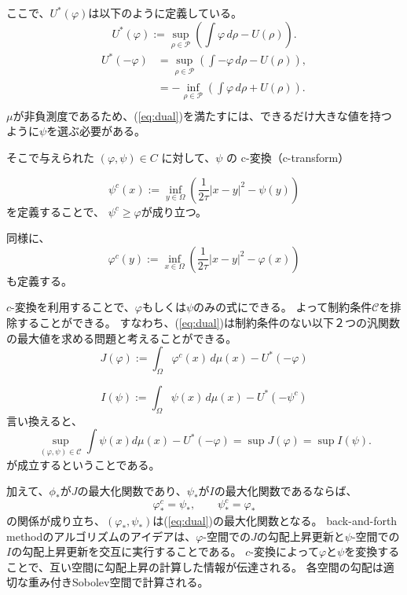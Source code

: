   ここで、$U^*(\varphi)$は以下のように定義している。 
  \[
    U^*(\varphi) := \sup_{\rho \in \mathcal{P}} \left(\int \varphi \, d\rho - U(\rho) \right).
  \]
  \begin{align*}
    U^*(- \varphi) &= \sup_{\rho \in \mathcal{P}} \left(\int - \varphi \, d\rho - U(\rho) \right),\\
                   &= - \inf_{\rho \in \mathcal{P}} \left(\int \varphi \, d\rho + U(\rho) \right) .\\
  \end{align*}
$\mu$が非負測度であるため、(\ref{eq:dual})を満たすには、できるだけ大きな値を持つように$\psi$を選ぶ必要がある。

そこで与えられた \((\varphi, \psi) \in C\) に対して、\(\psi\) の c-変換（c-transform）

\begin{equation*}
    \psi^c(x) := \inf_{y \in \Omega} \left( \frac{1}{2\tau}|x-y|^2 - \psi(y)\right)
\end{equation*}
を定義することで、
\(\psi^c \geq \varphi\)が成り立つ。

同様に、
\begin{equation*}
    \varphi^c(y) := \inf_{x \in \Omega} \left( \frac{1}{2\tau}|x-y|^2 - \varphi(x)\right)
\end{equation*}
も定義する。

$c$-変換を利用することで、$\varphi$もしくは$\psi$のみの式にできる。
よって制約条件$\mathcal{C}$を排除することができる。
すなわち、(\ref{eq:dual})は制約条件のない以下２つの汎関数の最大値を求める問題と考えることができる。
\begin{equation}
    \label{eq:J}
    J(\varphi):= \int_{\Omega} \varphi^c(x) \,d\mu(x) - U^*(- \varphi)
\end{equation}

\begin{equation}
    \label{eq:I}
    I(\psi):= \int_{\Omega} \psi(x) \, d\mu(x) - U^*(- \psi^{c})
\end{equation}
言い換えると、
\[
\sup_{(\varphi,\psi) \in \mathcal{C}} \int \psi(x) d\mu(x) - U^*(- \varphi) = \sup J(\varphi) = \sup I(\psi).
\]
が成立するということである。

加えて、$\phi_*$が$J$の最大化関数であり、$\psi_*$が$I$の最大化関数であるならば、
\[
    \varphi_*^c = \psi_*, \qquad \psi_*^c = \varphi_*
\]
の関係が成り立ち、$(\varphi_*, \psi_*)$は(\ref{eq:dual})の最大化関数となる。
back-and-forth methodのアルゴリズムのアイデアは、$\varphi$-空間での$J$の勾配上昇更新と$\psi$-空間での$I$の勾配上昇更新を交互に実行することである。
$c$-変換によって$\varphi$と$\psi$を変換することで、互い空間に勾配上昇の計算した情報が伝達される。
各空間の勾配は適切な重み付きSobolev空間で計算される。

